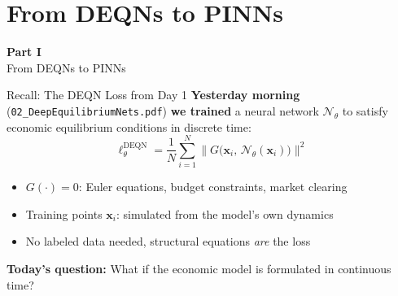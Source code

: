 \documentclass[aspectratio=169,11pt]{beamer}
\newcommand{\emphc}[1]{\textcolor{harvardcrimson}{#1}}
\newcommand{\x}{\bm{x}}
\begin{document}

\section{From DEQNs to PINNs}

\begin{frame}{}
\vfill
\begin{center}
{\Huge \textcolor{uzhblue}{\textbf{Part I}}}\\[12pt]
{\LARGE From DEQNs to PINNs}
\end{center}
\vfill
\end{frame}

\begin{frame}{Recall: The DEQN Loss from Day 1}
\textbf{Yesterday morning} (\texttt{02\_DeepEquilibriumNets.pdf}) \textbf{we trained} a neural network $\mathcal{N}_\theta$ to satisfy
economic equilibrium conditions in \emphc{discrete time}:
\[
\boxed{
\ell_\theta^{\text{DEQN}} = \frac{1}{N}\sum_{i=1}^{N}
\bigl\|G\bigl(\x_i,\,\mathcal{N}_\theta(\x_i)\bigr)\bigr\|^2
}
\]

\vspace{0.3em}
\begin{itemize}
    \item $G(\cdot) = 0$: Euler equations, budget constraints, market clearing
    \item Training points $\x_i$: simulated from the model's own dynamics
    \item \emphc{No labeled data needed}, structural equations \emph{are} the loss
\end{itemize}

\vspace{0.5em}
\textbf{Today's question:}
What if the economic model is formulated in \emphc{continuous time}?
\end{frame}
\end{document}
